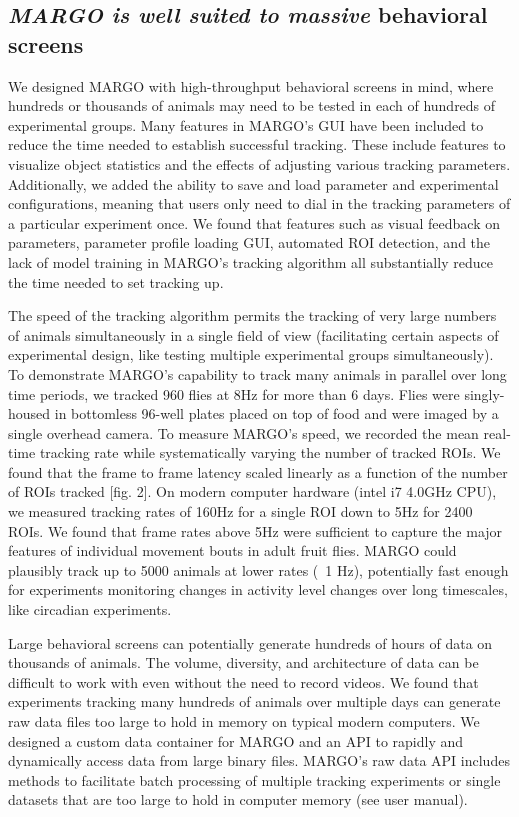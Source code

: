 \documentclass[10pt]{article}
\begin{document}
\begin{multicols}{2}
\subsection*{\textit{MARGO is well suited to massive} behavioral screens}

We designed MARGO with high-throughput behavioral screens in mind, where hundreds or thousands of animals may need to be tested in each of hundreds of experimental groups. Many features in MARGO's GUI have been included to reduce the time needed to establish successful tracking. These include features to visualize object statistics and the effects of adjusting various tracking parameters. Additionally, we added the ability to save and load parameter and experimental configurations, meaning that users only need to dial in the tracking parameters of a particular experiment once. We found that features such as visual feedback on parameters, parameter profile loading GUI, automated ROI detection, and the lack of model training in MARGO's tracking algorithm all substantially reduce the time needed to set tracking up. 

The speed of the tracking algorithm permits the tracking of very large numbers of animals simultaneously in a single field of view (facilitating certain aspects of experimental design, like testing multiple experimental groups simultaneously). To demonstrate MARGO's capability to track many animals in parallel over long time periods, we tracked 960 flies at 8Hz for more than 6 days. Flies were singly-housed in bottomless 96-well plates placed on top of food and were imaged by a single overhead camera. To measure MARGO's speed, we recorded the mean real-time tracking rate while systematically varying the number of tracked ROIs. We found that the frame to frame latency scaled linearly as a function of the number of ROIs tracked [fig. 2]. On modern computer hardware (intel i7 4.0GHz CPU), we measured tracking rates of 160Hz for a single ROI down to 5Hz for 2400 ROIs. We found that frame rates above 5Hz were sufficient to capture the major features of individual movement bouts in adult fruit flies. MARGO could plausibly track up to 5000 animals at lower rates (~1 Hz), potentially fast enough for experiments monitoring changes in activity level changes over long timescales, like circadian experiments. 

Large behavioral screens can potentially generate hundreds of hours of data on thousands of animals. The volume, diversity, and architecture of data can be difficult to work with even without the need to record videos. We found that experiments tracking many hundreds of animals over multiple days can generate raw data files too large to hold in memory on typical modern computers. We designed a custom data container for MARGO and an API to rapidly and dynamically access data from large binary files. MARGO's raw data API includes methods to facilitate batch processing of multiple tracking experiments or single datasets that are too large to hold in computer memory (see user manual). 


\end{multicols}
\end{document}
